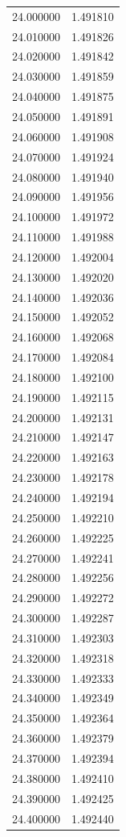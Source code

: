 \begin{tabular}{rr}
24.000000 & 1.491810 \\
24.010000 & 1.491826 \\
24.020000 & 1.491842 \\
24.030000 & 1.491859 \\
24.040000 & 1.491875 \\
24.050000 & 1.491891 \\
24.060000 & 1.491908 \\
24.070000 & 1.491924 \\
24.080000 & 1.491940 \\
24.090000 & 1.491956 \\
24.100000 & 1.491972 \\
24.110000 & 1.491988 \\
24.120000 & 1.492004 \\
24.130000 & 1.492020 \\
24.140000 & 1.492036 \\
24.150000 & 1.492052 \\
24.160000 & 1.492068 \\
24.170000 & 1.492084 \\
24.180000 & 1.492100 \\
24.190000 & 1.492115 \\
24.200000 & 1.492131 \\
24.210000 & 1.492147 \\
24.220000 & 1.492163 \\
24.230000 & 1.492178 \\
24.240000 & 1.492194 \\
24.250000 & 1.492210 \\
24.260000 & 1.492225 \\
24.270000 & 1.492241 \\
24.280000 & 1.492256 \\
24.290000 & 1.492272 \\
24.300000 & 1.492287 \\
24.310000 & 1.492303 \\
24.320000 & 1.492318 \\
24.330000 & 1.492333 \\
24.340000 & 1.492349 \\
24.350000 & 1.492364 \\
24.360000 & 1.492379 \\
24.370000 & 1.492394 \\
24.380000 & 1.492410 \\
24.390000 & 1.492425 \\
24.400000 & 1.492440 \\

\end{tabular}
